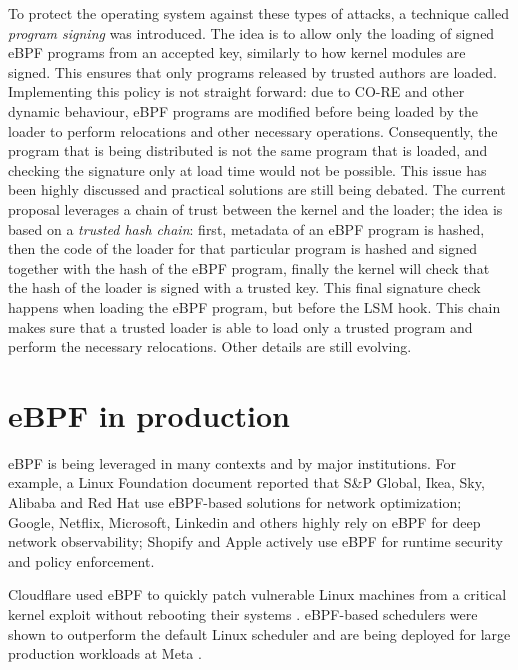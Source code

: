 To protect the operating system against these types of attacks, a technique
called \textit{program signing} was introduced. The idea is to allow only the
loading of signed eBPF programs from an accepted key, similarly to how kernel
modules are signed. This ensures that only programs released by trusted authors
are loaded. Implementing this policy is not straight forward: due to CO-RE and
other dynamic behaviour, eBPF programs are modified before being loaded by the
loader to perform relocations and other necessary operations. Consequently, the
program that is being distributed is not the same program that is loaded, and
checking the signature only at load time would not be possible. This issue has
been highly discussed and practical solutions are still being debated. The
current proposal leverages a chain of trust between the kernel and the loader;
the idea is based on a \textit{trusted hash chain}: first, metadata of an eBPF
program is hashed, then the code of the loader for that particular program is
hashed and signed together with the hash of the eBPF program, finally the kernel
will check that the hash of the loader is signed with a trusted key. This final
signature check happens when loading the eBPF program, but before the LSM hook.
This chain makes sure that a trusted loader is able to load only a trusted
program and perform the necessary relocations. Other details are still evolving.

\section{eBPF in production}

eBPF is being leveraged in many contexts and by major institutions. For example,
a Linux Foundation document \cite{linuxfoundation2026ebpf} reported that S\&P
Global, Ikea, Sky, Alibaba and Red Hat use eBPF-based solutions for network
optimization; Google, Netflix, Microsoft, Linkedin and others highly rely on
eBPF for deep network observability; Shopify and Apple actively use eBPF for
runtime security and policy enforcement.

Cloudflare used eBPF to quickly patch vulnerable Linux machines from a critical
kernel exploit without rebooting their systems \cite{arges2026copyfail}.
eBPF-based schedulers were shown to outperform the default Linux scheduler
\cite{ebpfscheduling} and are being deployed for large production workloads at
Meta \cite{heo2024schedext}.
